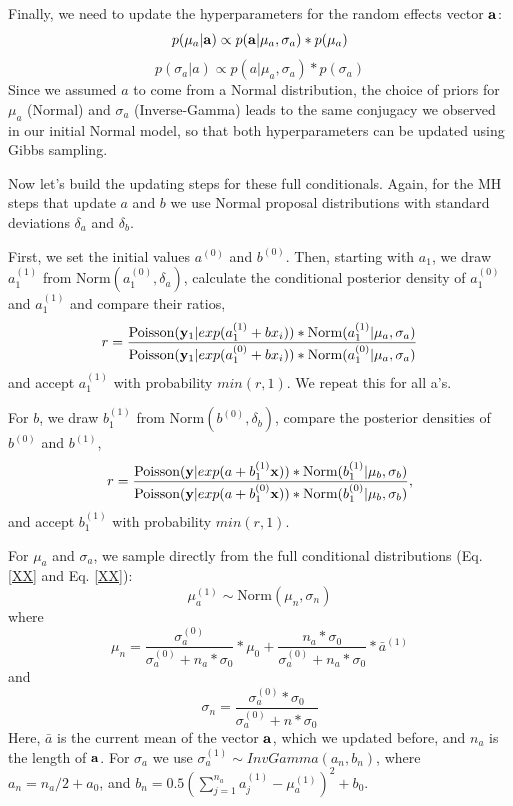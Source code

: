 Finally, we need to update the hyperparameters for the random effects
vector ${\bf a}$:
\[
p(\mu_a|{\bf a}) \propto p({\bf a}|\mu_a, \sigma_a) *p(\mu_a)
\]
\[
p(\sigma_a|a) \propto p(a|\mu_a, \sigma_a) *p(\sigma_a)
\]
Since we assumed $a$ to come from a Normal distribution, the choice of priors for $\mu_a$ (Normal) and $\sigma_a$ (Inverse-Gamma) leads to the same conjugacy we observed in our initial Normal model, so that both hyperparameters can be updated using Gibbs sampling.

Now let's build the updating steps for these full conditionals. Again, for the MH steps that update $a$ and $b$ we use Normal proposal distributions with standard deviations $\delta_{a}$ and $\delta_{b}$.

First, we set the initial values $a^{(0)}$ and $b^{(0)}$. Then, starting with $a_1$, we draw $a_1^{(1)}$ from $\mbox{Norm}(a_1^{(0)}, \delta_{a})$, calculate the conditional posterior density of $a_1^{(0)}$ and $a_1^{(1)}$  and compare their ratios,
\[
r = \frac{\mbox{Poisson}({\bf y}_{1}|exp(a_1^{(1)} + b x_i)) *
  \mbox{Norm}(a_1^{(1)}|\mu_a, \sigma_a)} {\mbox{Poisson}({\bf y}_{1}|exp(a_1^{(0)} + bx_i)) * \mbox{Norm}(a_1^{(0)}|\mu_a, \sigma_a)}
\]
and accept $a_1^{(1)}$ with probability $min(r,1)$. We repeat this for all a's.

For $b$, we draw $b_1^{(1)}$ from $\mbox{Norm} (b^{(0)}, \delta_{b})$, compare the posterior densities of $b^{(0)}$ and $b^{(1)}$,
\[
r = \frac{\mbox{Poisson}({\bf y}|exp(a + b_1^{(1)}{\bf x}))
  *\mbox{Norm}(b_1^{(1)}|\mu_b, \sigma_b)} { \mbox{Poisson}({\bf
    y}|exp(a + b_1^{(0)}{\bf x})) *\mbox{Norm}(b_1^{(0)}|\mu_b, \sigma_b)},
\]
and accept $b_1^{(1)}$  with probability $min(r,1)$.

For $\mu_a$ and $\sigma_a$, we sample directly from the full conditional distributions (Eq. \ref{XX}  and Eq. \ref{XX}):
\[
\mu_a^{(1)} \sim \mbox{Norm} (\mu_n, \sigma_n)
\]
where 
\[\mu_n =  \frac{\sigma_a^{(0)}}  {\sigma_a^{(0)}   +n_a  *  \sigma_0} *  \mu_0 +  \frac{n_a * \sigma_0} {\sigma_a^{(0)}   +n_a* \sigma_0} *\bar{a}^{(1)}
\]
and 
\[
\sigma_n= \frac{\sigma_a^{(0)}  * \sigma_0 } {\sigma_a^{(0)}  + n* \sigma_0}
\]
Here, $\bar{a}$ is the current mean of the vector $\bf{a}$, which we
updated before, and $n_a$ is the length of $\bf{a}$. 
For $\sigma_a$ we use $\sigma_a^{(1)}\sim InvGamma (a_n, b_n)$,
where  $a_n = n_a/2   + a_0$, and $b_n = 0.5 ( \displaystyle\sum\limits_{j=1}^{n_a} a_j^{(1)}-\mu_a^{(1)})^2+ b_0$.

